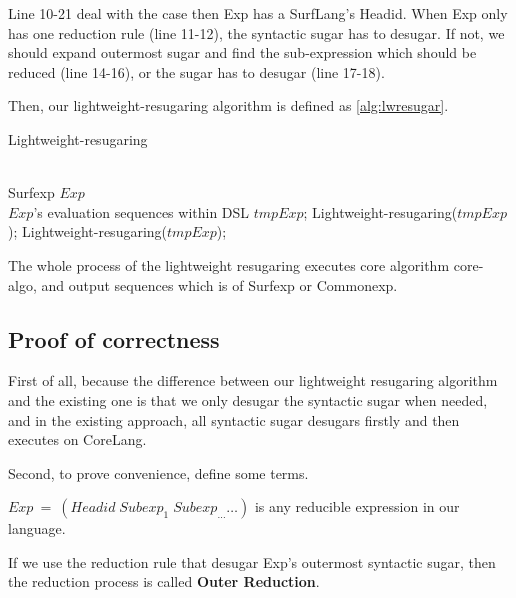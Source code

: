 Line 10-21 deal with the case then Exp has a SurfLang's Headid. When Exp only has one reduction rule (line 11-12), the syntactic sugar has to desugar. If not, we should expand outermost sugar and find the sub-expression which should be reduced (line 14-16), or the sugar has to desugar (line 17-18).


Then, our lightweight-resugaring algorithm is defined as \ref{alg:lwresugar}.

\begin{algorithm}
	\caption{Lightweight-resugaring}
	\label{alg:lwresugar}     %
	\begin{algorithmic}[1]       %
		\REQUIRE ~~\\      %
		Surfexp $Exp$
		\ENSURE ~~\\     %
		$Exp$'s evaluation sequences within DSL
		\RETURN
		\PRINT $tmpExp$;
		\STATE Lightweight-resugaring($tmpExp$);
		\ELSE 
		\STATE Lightweight-resugaring($tmpExp$);
		\ENDIF
		\ENDWHILE
		
	\end{algorithmic}
\end{algorithm}

The whole process of the lightweight resugaring executes core algorithm core-algo, and output sequences which is of Surfexp or Commonexp.

\subsection{Proof of correctness}

First of all, because the difference between our lightweight resugaring algorithm and the existing one is that we only desugar the syntactic sugar when needed, and in the existing approach, all syntactic sugar desugars firstly and then executes on CoreLang.

Second, to prove convenience, define some terms.

$Exp~=~(Headid\;Subexp_{1}\;Subexp_{\ldots} \ldots)$ is any reducible expression in our language.

If we use the reduction rule that desugar Exp's outermost syntactic sugar, then the reduction process is called {\bfseries Outer Reduction}.

